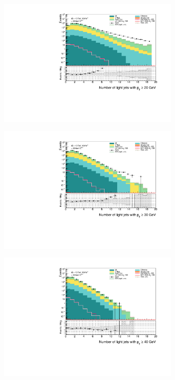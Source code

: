\documentclass[12pt, a4paper]{book}
\begin{document}
\begin{figure}[!ht]
    \centering
    \begin{subfigure}[b]{0.49\textwidth}
        \centering
        \includegraphics[width=\textwidth]{ljetsPt20.pdf}
    \end{subfigure}
    \hfill\begin{subfigure}[b]{0.49\textwidth}
        \centering
        \includegraphics[width=\textwidth]{ljetsPt30.pdf}
    \end{subfigure}
    \hfill\begin{subfigure}[b]{0.49\textwidth}
        \centering
        \includegraphics[width=\textwidth]{ljetsPt40.pdf}

\end{subfigure}
\end{figure}
\end{document}

